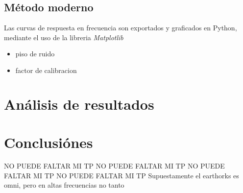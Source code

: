 \documentclass[]{article}
\begin{document}
\begin{multicols}{2}
\subsection{Método moderno}
Las curvas de respuesta en frecuencia son exportados y graficados en Python,
mediante el uso de la libreria \textit{Matplotlib}
\begin{itemize}
  \item piso de ruido
  \item factor de calibracion
\end{itemize}
\section{Análisis de resultados}



\section{Conclusiónes}
NO PUEDE FALTAR MI TP NO PUEDE FALTAR MI TP
NO PUEDE FALTAR MI TP NO PUEDE FALTAR MI TP
Supuestamente el earthorks es omni, pero en altas frecuencias no tanto

\printbibliography

\end{multicols}
\end{document}
